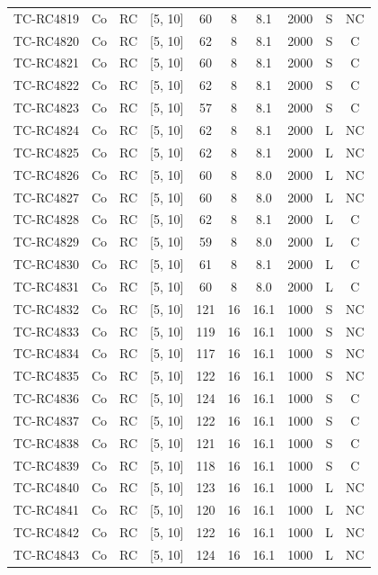 \begin{longtable}{lccccccccc}
TC-RC4819 & Co & RC & [5, 10] & 60 & 8 & 8.1 & 2000 & S & NC \\
TC-RC4820 & Co & RC & [5, 10] & 62 & 8 & 8.1 & 2000 & S & C \\
TC-RC4821 & Co & RC & [5, 10] & 60 & 8 & 8.1 & 2000 & S & C \\
TC-RC4822 & Co & RC & [5, 10] & 62 & 8 & 8.1 & 2000 & S & C \\
TC-RC4823 & Co & RC & [5, 10] & 57 & 8 & 8.1 & 2000 & S & C \\
TC-RC4824 & Co & RC & [5, 10] & 62 & 8 & 8.1 & 2000 & L & NC \\
TC-RC4825 & Co & RC & [5, 10] & 62 & 8 & 8.1 & 2000 & L & NC \\
TC-RC4826 & Co & RC & [5, 10] & 60 & 8 & 8.0 & 2000 & L & NC \\
TC-RC4827 & Co & RC & [5, 10] & 60 & 8 & 8.0 & 2000 & L & NC \\
TC-RC4828 & Co & RC & [5, 10] & 62 & 8 & 8.1 & 2000 & L & C \\
TC-RC4829 & Co & RC & [5, 10] & 59 & 8 & 8.0 & 2000 & L & C \\
TC-RC4830 & Co & RC & [5, 10] & 61 & 8 & 8.1 & 2000 & L & C \\
TC-RC4831 & Co & RC & [5, 10] & 60 & 8 & 8.0 & 2000 & L & C \\
TC-RC4832 & Co & RC & [5, 10] & 121 & 16 & 16.1 & 1000 & S & NC \\
TC-RC4833 & Co & RC & [5, 10] & 119 & 16 & 16.1 & 1000 & S & NC \\
TC-RC4834 & Co & RC & [5, 10] & 117 & 16 & 16.1 & 1000 & S & NC \\
TC-RC4835 & Co & RC & [5, 10] & 122 & 16 & 16.1 & 1000 & S & NC \\
TC-RC4836 & Co & RC & [5, 10] & 124 & 16 & 16.1 & 1000 & S & C \\
TC-RC4837 & Co & RC & [5, 10] & 122 & 16 & 16.1 & 1000 & S & C \\
TC-RC4838 & Co & RC & [5, 10] & 121 & 16 & 16.1 & 1000 & S & C \\
TC-RC4839 & Co & RC & [5, 10] & 118 & 16 & 16.1 & 1000 & S & C \\
TC-RC4840 & Co & RC & [5, 10] & 123 & 16 & 16.1 & 1000 & L & NC \\
TC-RC4841 & Co & RC & [5, 10] & 120 & 16 & 16.1 & 1000 & L & NC \\
TC-RC4842 & Co & RC & [5, 10] & 122 & 16 & 16.1 & 1000 & L & NC \\
TC-RC4843 & Co & RC & [5, 10] & 124 & 16 & 16.1 & 1000 & L & NC \\

\end{longtable}

